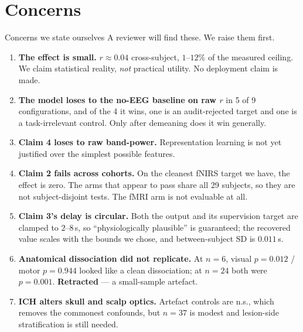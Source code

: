 \documentclass[aspectratio=169,11pt]{beamer}
\begin{document}
\section{Concerns}
\begin{frame}{Concerns we state ourselves}
A reviewer will find these. We raise them first.

\begin{enumerate}
  \item \textbf{The effect is small.} $r\approx0.04$ cross-subject, $1$--$12\%$
        of the measured ceiling. We claim statistical reality, \emph{not}
        practical utility. No deployment claim is made.
  \item \textbf{The model loses to the no-EEG baseline on raw $r$} in 5 of 9
        configurations, and of the 4 it wins, one is an audit-rejected target and
        one is a task-irrelevant control. Only after demeaning does it win
        generally.
  \item \textbf{Claim 4 loses to raw band-power.} Representation learning is not
        yet justified over the simplest possible features.
  \item \textbf{Claim 2 fails across cohorts.} On the cleanest fNIRS target we
        have, the effect is zero. The arms that appear to pass share all 29
        subjects, so they are not subject-disjoint tests. The fMRI arm is not
        evaluable at all.
  \item \textbf{Claim 3's delay is circular.} Both the output and its supervision
        target are clamped to $2$--$8$\,s, so ``physiologically plausible'' is
        guaranteed; the recovered value scales with the bounds we chose, and
        between-subject SD is $0.011$\,s.
  \item \textbf{Anatomical dissociation did not replicate.} At $n=6$, visual
        $p=0.012$ / motor $p=0.944$ looked like a clean dissociation; at $n=24$
        both were $p=0.001$. \textbf{Retracted} --- a small-sample artefact.
  \item \textbf{ICH alters skull and scalp optics.} Artefact controls are n.s.,
        which removes the commonest confounds, but $n=37$ is modest and
        lesion-side stratification is still needed.
\end{enumerate}
\end{frame}

\end{document}

